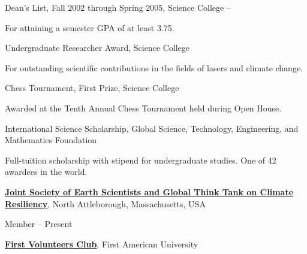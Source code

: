 \documentclass[letterpaper,MMMyyyy,nonstopmode]{./simple-resume-cv-master/simpleresumecv}
\begin{document}
\begin{Body}

\BulletItem
	Dean's List,
	Fall 2002 through Spring 2005,
	Science College
	\hfill
	 --
\begin{Detail}
	\Item
	For attaining a semester GPA of at least 3.75.
\end{Detail}

\Gap
\BulletItem
	Undergraduate Researcher Award,
	Science College
	\hfill
\begin{Detail}
	\Item
	For outstanding scientific contributions in the fields of lasers and climate change.
\end{Detail}

\Gap
\BulletItem
	Chess Tournament,
	First Prize,
	Science College
	\hfill
\begin{Detail}
	\Item
	Awarded at the Tenth Annual Chess Tournament held during Open House.
\end{Detail}

\Gap
\BulletItem
	International Science Scholarship,
	\hfill
	\newline
	Global Science, Technology, Engineering, and Mathematics Foundation
\begin{Detail}
	\Item
	Full-tuition scholarship with stipend for undergraduate studies.
	One of 42 awardees in the world.
\end{Detail}


\Entry
	\href{http://www.example.com/my-society}
	{\textbf{Joint Society of Earth Scientists and Global Think Tank on Climate Resiliency}},
	\newline
	North Attleborough, Massachusetts, USA

\Gap
\BulletItem
	Member
	\hfill
	 --
	Present

\newpage


\Entry
\href{http://www.example.com/my-club}
{\textbf{First Volunteers Club}},
First American University


\end{Body}
\end{document}
